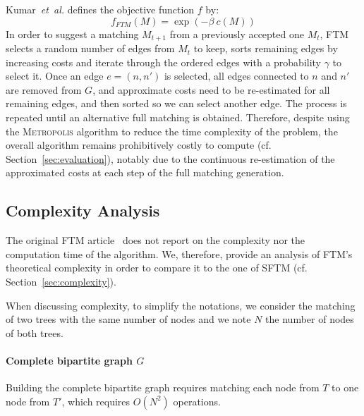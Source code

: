 Kumar~\emph{et~al.} defines the objective function $f$ by:
\begin{equation} \label{eq:objective_FTM}
	f_{FTM}(M) = \exp(-\beta\ c(M))
\end{equation}
In order to suggest a matching $M_{t+1}$ from a previously accepted one $M_t$, FTM selects a random number of edges from $M_t$ to keep, sorts remaining edges by increasing costs and iterate through the ordered edges with a probability $\gamma$ to select it.
Once an edge $e = (n,n')$ is selected, all edges connected to $n$ and $n'$ are removed from $G$, and approximate costs need to be re-estimated for all remaining edges, and then sorted so we can select another edge.
The process is repeated until an alternative full matching is obtained.
Therefore, despite using the \textsc{Metropolis} algorithm to reduce the time complexity of the problem, the overall algorithm remains prohibitively costly to compute (cf. Section~\ref{sec:evaluation}), notably due to the continuous re-estimation of the approximated costs at each step of the full matching generation.

\subsection{Complexity Analysis}\label{sec:ftm_complexity}
The original FTM article~\cite{Kumar2011_FTM} does not report on the complexity nor the computation time of the algorithm.
We, therefore, provide an analysis of FTM's theoretical complexity in order to compare it to the one of SFTM (cf. Section~\ref{sec:complexity}).

When discussing complexity, to simplify the notations, we consider the matching of two trees with the same number of nodes and we note $N$ the number of nodes of both trees.

\paragraph{Complete bipartite graph $G$}
Building the complete bipartite graph requires matching each node from $T$ to one node from $T'$, which requires $O(N^2)$ operations. 


